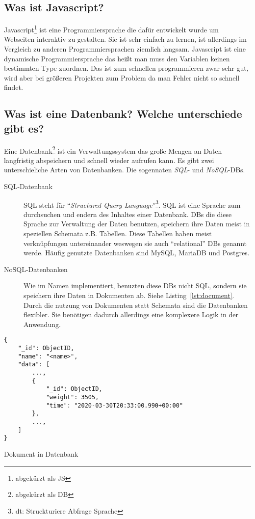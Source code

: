 \documentclass[a4paper, ngerman, 12pt]{scrartcl}
\begin{document}
\subsection{Was ist Javascript?}

Javascript\footnote{abgekürzt als JS} ist eine Programmiersprache die dafür entwickelt wurde um Webseiten interaktiv zu gestalten.
Sie ist sehr einfach zu lernen, ist allerdings im Vergleich zu anderen Programmiersprachen ziemlich langsam.
Javascript ist eine dynamische Programmiersprache das heißt man muss den Variablen keinen bestimmten Type zuordnen.
Das ist zum schnellen programmieren zwar sehr gut, wird aber bei größeren Projekten zum Problem da man Fehler nicht so schnell findet.

\subsection[Wo ist Datenbank? (Sql vs NoSql)]{Was ist eine Datenbank? Welche unterschiede gibt es?}

Eine Datenbank\footnote{abgekürzt als DB} ist ein Verwaltungssystem das große Mengen an Daten langfristig abspeichern und schnell wieder aufrufen kann.
Es gibt zwei unterschieliche Arten von Datenbanken. Die sogennaten \emph{SQL}- und \emph{NoSQL}-DBs.

\begin{description}
	\item[SQL-Datenbank] SQL steht für \enquote{\emph{Structured Query Language}}\footnote{dt: Struckturiere Abfrage Sprache}.
		SQL ist eine Sprache zum durchsuchen und endern des Inhaltes einer Datenbank.
		DBs die diese Sprache zur Verwaltung der Daten benutzen, speichern ihre Daten meist in speziellen Schemata z.B. Tabellen.
		Diese Tabellen haben meist verknüpfungen untereinander weswegen sie auch \enquote{relational} DBs genannt werde.
		Häufig genutzte Datenbanken sind MySQL, MariaDB und Postgres.
	\item[NoSQL-Datenbanken] Wie im Namen implementiert, benuzten diese DBs nicht SQL, sondern sie speichern ihre Daten in Dokumenten ab. Siehe Listing~\ref{lst:document}.
		Durch die nutzung von Dokumenten statt Schemata sind die Datenbanken flexibler.
		Sie benötigen dadurch allerdings eine komplexere Logik in der Anwendung.
\end{description}

\begin{listing}[H]
\begin{verbatim}
{
	"_id": ObjectID,
	"name": "<name>",
	"data": [
		...,
		{
			"_id": ObjectID,
			"weight": 3505,
			"time": "2020-03-30T20:33:00.990+00:00"
		},
		...,
	]
}
\end{verbatim}
\caption{Dokument in Datenbank\label{lst:document}}
\end{listing}
\end{document}
